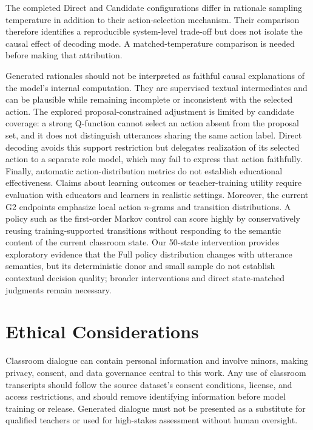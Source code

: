 \documentclass[manuscript,review,anonymous]{acmart}
\begin{document}
The completed Direct and Candidate configurations differ in rationale sampling
temperature in addition to their action-selection mechanism. Their comparison
therefore identifies a reproducible system-level trade-off but does not isolate
the causal effect of decoding mode. A matched-temperature comparison is needed
before making that attribution.

Generated rationales should not be interpreted as faithful causal explanations of the model's internal computation.
They are supervised textual intermediates and can be plausible while remaining incomplete or inconsistent with the selected action.
The explored proposal-constrained adjustment is limited by candidate coverage: a strong Q-function cannot select an action absent from the proposal set, and it does not distinguish utterances sharing the same action label. Direct decoding avoids this support restriction but delegates realization of its selected action to a separate role model, which may fail to express that action faithfully.
Finally, automatic action-distribution metrics do not establish educational effectiveness.
Claims about learning outcomes or teacher-training utility require evaluation with educators and learners in realistic settings.
Moreover, the current G2 endpoints emphasize local action $n$-grams and
transition distributions. A policy such as the first-order Markov control can
score highly by conservatively reusing training-supported transitions without
responding to the semantic content of the current classroom state. Our
50-state intervention provides exploratory evidence that the Full policy
distribution changes with utterance semantics, but its deterministic donor and
small sample do not establish contextual decision quality; broader
interventions and direct state-matched judgments remain necessary.

\section*{Ethical Considerations}

Classroom dialogue can contain personal information and involve minors, making privacy, consent, and data governance central to this work.
Any use of classroom transcripts should follow the source dataset's consent conditions, license, and access restrictions, and should remove identifying information before model training or release.
Generated dialogue must not be presented as a substitute for qualified teachers or used for high-stakes assessment without human oversight.
\end{document}
